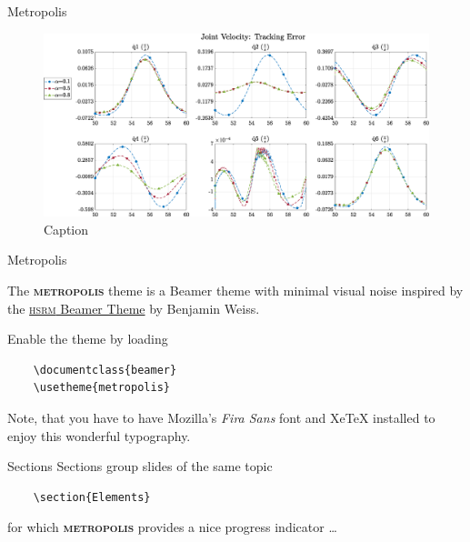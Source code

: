 \documentclass[10pt]{beamer}
\newcommand{\themename}{\textbf{\textsc{metropolis}}\xspace}
\begin{document}
\begin{frame}[fragile]{Metropolis}

  \begin{figure}
      \centering
      \hspace*{-0.7cm}\includegraphics[width=1.1\linewidth]{img/articular_SMCi_velocity_error_compare.eps}
      \caption{Caption}
      \label{fig:my_label}
  \end{figure}

\end{frame}

\begin{frame}[fragile]{Metropolis}

  The \themename theme is a Beamer theme with minimal visual noise
  inspired by the \href{https://github.com/hsrmbeamertheme/hsrmbeamertheme}{\textsc{hsrm} Beamer
  Theme} by Benjamin Weiss.

  Enable the theme by loading

  \begin{verbatim}    \documentclass{beamer}
    \usetheme{metropolis}\end{verbatim}

  Note, that you have to have Mozilla's \emph{Fira Sans} font and XeTeX
  installed to enjoy this wonderful typography.
\end{frame}
\begin{frame}[fragile]{Sections}
  Sections group slides of the same topic

  \begin{verbatim}    \section{Elements}\end{verbatim}

  for which \themename provides a nice progress indicator \ldots
  
\end{frame}
\end{document}
